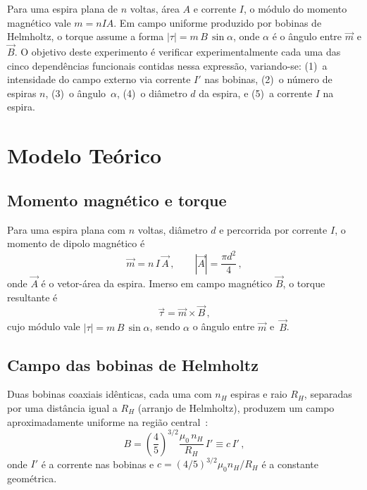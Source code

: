 \documentclass[aps, twocolumn, superscriptaddress, floatfix, nofootinbib]{revtex4-2}
\begin{document}
Para uma espira plana de $n$ voltas, área $A$ e corrente $I$, o módulo do
momento magnético vale $m = nIA$. Em campo uniforme produzido por bobinas de
Helmholtz, o torque assume a forma $|\tau| = m\,B\,\sin\alpha$, onde $\alpha$
é o ângulo entre $\vec{m}$ e $\vec{B}$. O objetivo deste experimento é
verificar experimentalmente cada uma das cinco dependências funcionais contidas
nessa expressão, variando-se: (1)~a intensidade do campo externo via corrente
$I'$ nas bobinas, (2)~o número de espiras $n$, (3)~o ângulo~$\alpha$, (4)~o
diâmetro $d$ da espira, e (5)~a corrente $I$ na espira.


\section{Modelo Teórico}\label{sec:teoria}

\subsection{Momento magnético e torque}

Para uma espira plana com $n$ voltas, diâmetro $d$ e percorrida por corrente
$I$, o momento de dipolo magnético é~\cite{Griffiths2017}
\begin{equation}\label{eq:momento}
  \vec{m} = n\,I\,\vec{A}\,, \qquad |\vec{A}| = \frac{\pi d^2}{4}\,,
\end{equation}
onde $\vec{A}$ é o vetor-área da espira. Imerso em campo magnético
$\vec{B}$, o torque resultante é
\begin{equation}\label{eq:torque}
  \vec{\tau} = \vec{m}\times\vec{B}\,,
\end{equation}
cujo módulo vale $|\tau| = m\,B\,\sin\alpha$, sendo $\alpha$ o ângulo entre
$\vec{m}$ e~$\vec{B}$.

\subsection{Campo das bobinas de Helmholtz}

Duas bobinas coaxiais idênticas, cada uma com $n_H$ espiras e raio $R_H$,
separadas por uma distância igual a $R_H$ (arranjo de Helmholtz), produzem um
campo aproximadamente uniforme na região central~\cite{PHYWE}:
\begin{equation}\label{eq:helmholtz}
  B = \left(\frac{4}{5}\right)^{3/2}\frac{\mu_0\,n_H}{R_H}\,I'
    \equiv c\,I'\,,
\end{equation}
onde $I'$ é a corrente nas bobinas e $c=(4/5)^{3/2}\mu_0 n_H/R_H$ é a
constante geométrica.
\end{document}
